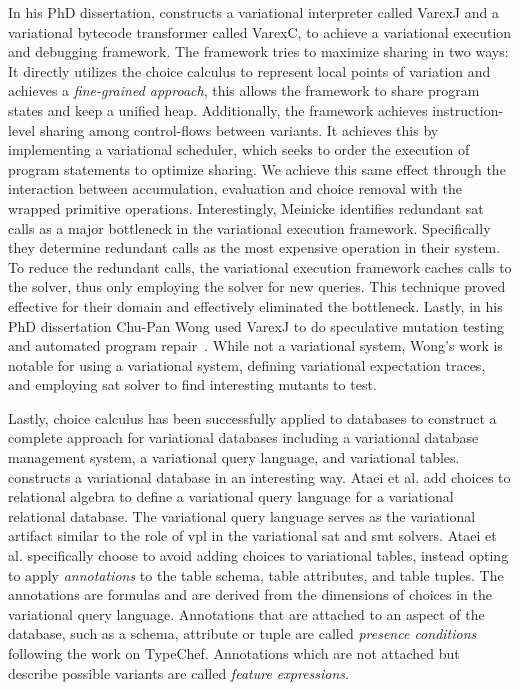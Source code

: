 In his PhD dissertation, \citet{M14,JensDebugging} constructs a variational
interpreter called VarexJ and a variational bytecode transformer called VarexC,
to achieve a variational execution and debugging framework. The framework tries
to maximize sharing in two ways: It directly utilizes the choice calculus to
represent local points of variation and achieves a \emph{fine-grained approach},
this allows the framework to share program states and keep a unified heap.
Additionally, the framework achieves instruction-level sharing among
control-flows between variants. It achieves this by implementing a variational
scheduler, which seeks to order the execution of program statements to optimize
sharing. We achieve this same effect through the interaction between
accumulation, evaluation and choice removal with the wrapped primitive
operations. Interestingly, Meinicke identifies redundant \ac{sat} calls as a
major bottleneck in the variational execution framework. Specifically they
determine redundant  calls as the most expensive operation in
their system. To reduce the redundant calls, the variational execution framework
caches calls to the solver, thus only employing the solver for new queries. This
technique proved effective for their domain and effectively eliminated the
bottleneck. Lastly, in his PhD dissertation Chu-Pan Wong used VarexJ to do
speculative mutation testing and automated program repair~\cite{ChuPanThesis}.
While not a variational system, Wong's work is notable for using a variational
system, defining variational expectation traces, and employing \ac{sat} solver
to find interesting mutants to test.


Lastly, choice calculus has been successfully applied to databases to construct
a complete approach for variational databases including a variational database
management system, a variational query language, and variational tables.
\citet{ATW17dbpl,ATW18poly} constructs a variational database in an interesting
way. Ataei et al. add choices to relational algebra to define a variational
query language for a variational relational database. The variational query
language serves as the variational artifact similar to the role of \ac{vpl} in
the variational \ac{sat} and \ac{smt} solvers. Ataei et al. specifically choose
to avoid adding choices to variational tables, instead opting to apply
\emph{annotations} to the table schema, table attributes, and table tuples. The
annotations are \pl{} formulas and are derived from the dimensions of choices in
the variational query language. Annotations that are attached to an aspect of
the database, such as a schema, attribute or tuple are called \emph{presence
  conditions} following the work on TypeChef. Annotations which are not attached
but describe possible variants are called \emph{feature expressions}.

